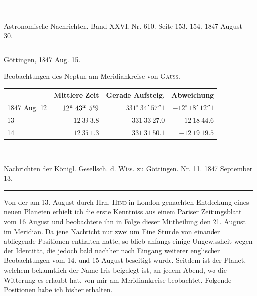 \clearpage
{}
\hypertarget{native-477-lower}{}
\begin{center}
\rule{0.55\linewidth}{0.4pt}\\[2pt]
Astronomische Nachrichten. Band XXVI. Nr. 610. Seite 153. 154. 1847 August 30.\\[2pt]
\rule{0.55\linewidth}{0.4pt}
\end{center}
\begin{flushright}Göttingen, 1847 Aug. 15.\end{flushright}

Beobachtungen des Neptun am Meridiankreise von \textsc{Gauss}.

\begin{center}
\setlength{\tabcolsep}{3pt}
\begin{tabular}{l|r|r|r}
 & Mittlere Zeit & Gerade Aufsteig. & Abweichung \\\hline
1847 Aug. 12 & $12^{\rm u}\ 43^{\rm m}\ 5^{\rm s}9$ & $331^\circ\ 34'\ 57''1$ & $-12^\circ\ 18'\ 12''1$ \\
\hfill 13 & $12\ 39\ 3.8$ & $331\ 33\ 27.0$ & $-12\ 18\ 44.6$ \\
\hfill 14 & $12\ 35\ 1.3$ & $331\ 31\ 50.1$ & $-12\ 19\ 19.5$ \\
\end{tabular}
\end{center}

\clearpage
{}
\begin{center}
\rule{0.55\linewidth}{0.4pt}\\[2pt]
Nachrichten der Königl. Gesellsch. d. Wiss. zu Göttingen. Nr. 11. 1847 September 13.\\[2pt]
\rule{0.55\linewidth}{0.4pt}
\end{center}

Von der am 13. August durch Hrn. \textsc{Hind} in London gemachten Entdeckung eines neuen Planeten erhielt ich die erste Kenntniss aus einem Pariser Zeitungsblatt vom 16 August und beobachtete ihn in Folge dieser Mittheilung den 21. August im Meridian. Da jene Nachricht nur zwei um Eine Stunde von einander abliegende Positionen enthalten hatte, so blieb anfangs einige Ungewissheit wegen der Identität, die jedoch bald nachher nach Eingang weiterer englischer Beobachtungen vom 14. und 15 August beseitigt wurde. Seitdem ist der Planet, welchem bekanntlich der Name Iris beigelegt ist, an jedem Abend, wo die Witterung es erlaubt hat, von mir am Meridiankreise beobachtet. Folgende Positionen habe ich bisher erhalten.

